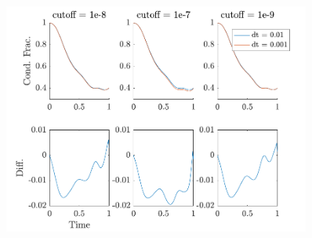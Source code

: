 \begin{figure}[h]
	\centering
	\includegraphics[width=0.9\textwidth]{Figures/CompareTimeStep.pdf}
	\caption{\textit{}}
	\label{fig:TimeStep}
\end{figure}

